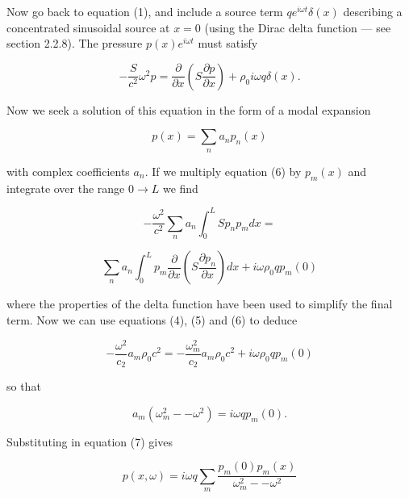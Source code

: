   Now go back to equation (1), and include a source term $q e^{i \omega t} 
  \delta(x)$ describing a concentrated sinusoidal source at $x=0$ (using the 
  Dirac delta function --- see section 2.2.8). The pressure $p(x) e^{i \omega 
  t}$ must satisfy 

  \begin{equation*}-\dfrac{S}{c^2} \omega^2 p = \dfrac{\partial}{\partial 
  x}\left(S\dfrac{\partial p}{\partial x} \right) + \rho_0 i \omega q 
  \delta(x). \tag{6}\end{equation*} 

  Now we seek a solution of this equation in the form of a modal expansion 

  \begin{equation*}p(x) = \sum_n{a_n p_n(x)} \tag{7}\end{equation*} 

  \noindent{}with complex coefficients $a_n$. If we multiply equation (6) by 
  $p_m(x)$ and integrate over the range $0 \rightarrow L$ we find 

  \begin{equation*}-\dfrac{\omega^2}{c^2} \sum_n{a_n \int_0^L{S p_n p_m 
  dx}}=\end{equation*} 

  \begin{equation*}\sum_n{a_n \int_0^L{p_m \dfrac{\partial}{\partial 
  x}\left(S\dfrac{\partial p_n}{\partial x} \right) dx}} + i \omega \rho_0 q 
  p_m(0) \tag{8}\end{equation*} 

  \noindent{}where the properties of the delta function have been used to 
  simplify the final term. Now we can use equations (4), (5) and (6) to deduce 

  \begin{equation*}-\dfrac{\omega^2}{c_2}a_m \rho_0 c^2 = 
  -\dfrac{\omega_m^2}{c_2}a_m \rho_0 c^2 + i \omega \rho_0 q p_m(0) 
  \tag{9}\end{equation*} 

  \noindent{}so that 

  \begin{equation*}a_m (\omega_m^2 -- \omega^2) = i \omega q p_m(0). 
  \tag{10}\end{equation*} 

  Substituting in equation (7) gives 

  \begin{equation*}p(x,\omega)= i \omega q \sum_m{\dfrac{p_m(0) 
  p_m(x)}{\omega_m^2 -- \omega^2}} \tag{11}\end{equation*} 

